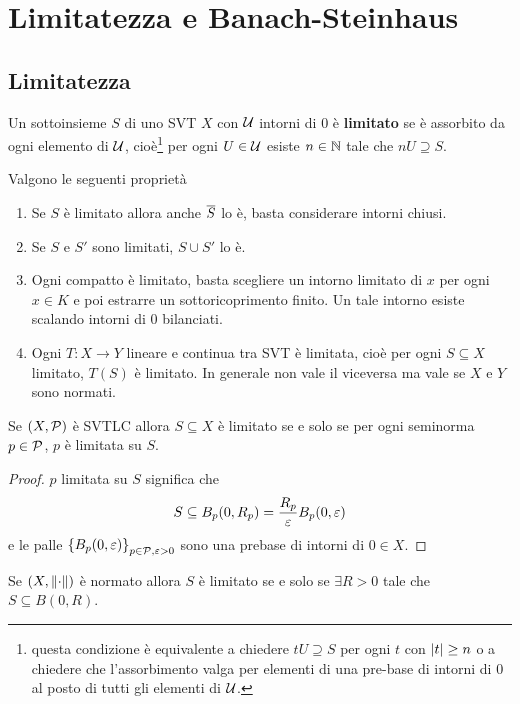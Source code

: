 \chapter{Limitatezza e Banach-Steinhaus}

\section{Limitatezza}
\begin{definition}
Un sottoinsieme $S$ di uno SVT $X$ con $\mathcal{U}$ intorni di $0$ \`e \textbf{limitato} se \`e assorbito da ogni elemento di $\mathcal{U}$, cio\`e\footnote{questa condizione \`e equivalente a chiedere $tU\supseteq S$ per ogni $t$ con $\left|{t}\right|\geq n$ o a chiedere che l'assorbimento valga per elementi di una pre-base di intorni di $0$ al posto di tutti gli elementi di $\mathcal{U}$.} per ogni $U\in\mathcal{U}$ esiste $n\in\mathbb{N}$ tale che $nU\supseteq S$.
\end{definition}
\begin{remark}
Valgono le seguenti propriet\`a
\begin{enumerate}
    \item Se $S$ \`e limitato allora anche $\overline{S}$ lo \`e, basta considerare intorni chiusi.
    \item Se $S$ e $S'$ sono limitati, $S\cup S'$ lo \`e.
    \item Ogni compatto \`e limitato, basta scegliere un intorno limitato di $x$ per ogni $x\in K$ e poi estrarre un sottoricoprimento finito. Un tale intorno esiste scalando intorni di $0$ bilanciati.
    \item Ogni $T:X\to Y$ lineare e continua tra SVT \`e limitata, cio\`e per ogni $S\subseteq X$ limitato, $T(S)$ \`e limitato. In generale non vale il viceversa ma vale se $X$ e $Y$ sono normati.
\end{enumerate}
\end{remark}

\begin{proposition}\label{PrLimitatezzaInSVTLC}
Se $(X,\mathcal{P})$ \`e SVTLC allora $S\subseteq X$ \`e limitato se e solo se per ogni seminorma $p\in \mathcal{P}$, $p$ \`e limitata su $S$.
\end{proposition}
\begin{proof}
$p$ limitata su $S$ significa che 
\[S\subseteq B_p(0,R_p)=\frac{R_p}{\varepsilon} B_p(0,\varepsilon)\]
e le palle $\left\{{B_p(0,\varepsilon)}\right\}_{p\in\mathcal{P}, \varepsilon>0}$ sono una prebase di intorni di $0\in X$.
\end{proof}
\begin{corollary}
Se $(X,\left\Vert{\cdot}\right\Vert)$ \`e normato allora $S$ \`e limitato se e solo se $\exists R>0$ tale che $S\subseteq B(0,R)$.
\end{corollary}

